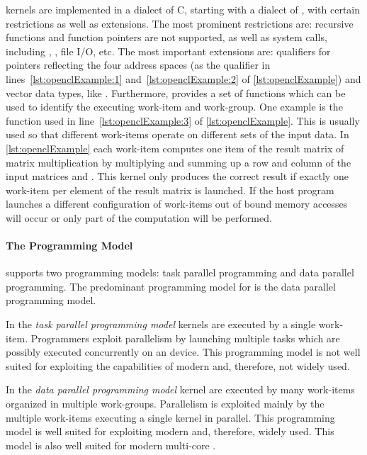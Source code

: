 \OpenCL kernels are implemented in a dialect of C, starting with  a dialect of \Cpp, with certain restrictions as well as extensions.
The most prominent restrictions are:
recursive functions and function pointers are not supported, as well as system calls, including , , file I/O, etc.
The most important extensions are:
qualifiers for pointers reflecting the four address spaces (as the  qualifier in lines~\ref{lst:openclExample:1} and~\ref{lst:openclExample:2} of \autoref{lst:openclExample}) and vector data types, like .
Furthermore, \OpenCL provides a set of functions which can be used to identify the executing work-item and work-group.
One example is the  function used in line~\ref{lst:openclExample:3} of \autoref{lst:openclExample}.
This is usually used so that different work-items operate on different sets of the input data.
In \autoref{lst:openclExample} each work-item computes one item of the result matrix  of matrix multiplication by multiplying and summing up a row and column of the input matrices  and .
This kernel only produces the correct result if exactly one work-item per element of the result matrix is launched.
If the host program launches a different configuration of work-items out of bound memory accesses will occur or only part of the computation will be performed.

\paragraph{The \OpenCL Programming Model}

\OpenCL supports two programming models: task parallel programming and data parallel programming.
The predominant programming model for \OpenCL is the data parallel programming model.

In the \emph{task parallel programming model} kernels are executed by a single work-item.
Programmers exploit parallelism by launching multiple tasks which are possibly executed concurrently on an \OpenCL device.
This programming model is not well suited for exploiting the capabilities of modern \GPUs and, therefore, not widely used.

In the \emph{data parallel programming model} kernel are executed by many work-items organized in multiple work-groups.
Parallelism is exploited mainly by the multiple work-items executing a single kernel in parallel.
This programming model is well suited for exploiting modern \GPUs and, therefore, widely used.
This model is also well suited for modern multi-core \CPUs.

